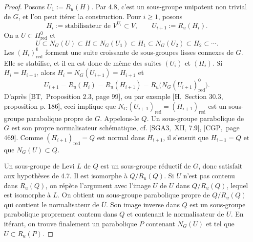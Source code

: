 \documentclass[11pt]{article}
\newcommand{\red}{\mathrm{red}}
\begin{document}
\begin{proof}
Posons \(U_1:=R_u(H)\). Par 4.8, c'est un sous-groupe unipotent non trivial de \(G\),
et l'on peut itérer la construction. Pour \(i\ge1\), posons
\[
  H_i:=\text{stabilisateur de }V^{U_i}\subset V,
  \qquad U_{i+1}:=R_u(H_i).
\]
On a \(U\subset H^0_{\red}\) et
\begin{equation}
  U\subset N_G(U)\subset H\subset N_G(U_1)\subset H_1
  \subset N_G(U_2)\subset H_2\subset\cdots .
  \tag{4.8.1}
\end{equation}
Les \((H_i)^0_{\red}\) forment une suite croissante de sous-groupes lisses connexes de
\(G\). Elle se stabilise, et il en est donc de même des suites \((U_i)\) et \((H_i)\).
Si \(H_i=H_{i+1}\), alors \(H_i=N_G(U_{i+1})=H_{i+1}\) et
\[
  U_{i+1}=R_u(H_i)=R_u(H_{i+1})=R_u\bigl(N_G(U_{i+1})^0_{\red}\bigr).
\]
D'après \([\mathrm{BT},\) Proposition 2.3, page 99], ou par exemple
\([\mathrm H,\) Section 30.3, proposition p. 186], ceci implique que
\(N_G(U_{i+1})_{\red}=(H_{i+1})_{\red}\) est un sous-groupe parabolique propre de
\(G\). Appelons-le \(Q\). Un sous-groupe parabolique de \(G\) est son propre
normalisateur schématique, cf. \([\mathrm{SGA3},\) XII, 7.9], \([\mathrm{CGP},\) page
469]. Comme \((H_{i+1})_{\red}=Q\) est normal dans \(H_{i+1}\), il s'ensuit que
\(H_{i+1}=Q\) et que \(N_G(U)\subset Q\).

Un sous-groupe de Levi \(L\) de \(Q\) est un sous-groupe réductif de \(G\), donc satisfait
aux hypothèses de 4.7. Il est isomorphe à \(Q/R_u(Q)\). Si \(U\) n'est pas contenu
dans \(R_u(Q)\), on répète l'argument avec l'image \(\overline U\) de \(U\) dans
\(Q/R_u(Q)\), lequel est isomorphe à \(L\). On obtient un sous-groupe parabolique propre
de \(Q/R_u(Q)\) qui contient le normalisateur de \(\overline U\). Son image inverse dans
\(Q\) est un sous-groupe parabolique proprement contenu dans \(Q\) et contenant le
normalisateur de \(U\). En itérant, on trouve finalement un parabolique \(P\) contenant
\(N_G(U)\) et tel que \(U\subset R_u(P)\).
\end{proof}
\end{document}
